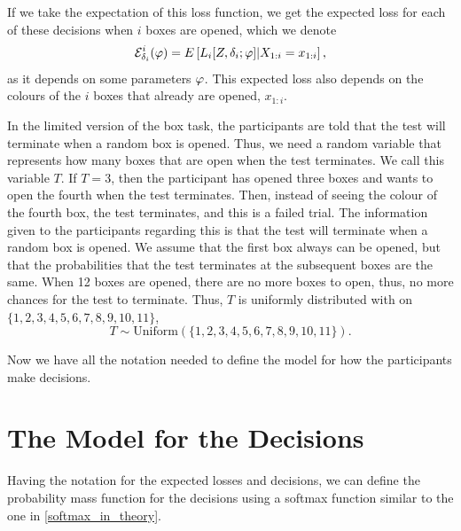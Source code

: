 If we take the expectation of this loss function, we get the expected loss for each of these decisions when $i$ boxes are opened, which we denote
\begin{equation*}
    \mathcal{E}^i_{\delta_i}(\varphi) = E\left[ L_i[Z,\delta_i;\varphi]|X_{1:i}=x_{1:i}\right],
\end{equation*}
as it depends on some parameters $\varphi$. This expected loss also depends on the colours of the $i$ boxes that already are opened, $x_{1:i}$.

In the limited version of the box task, the participants are told that the test will terminate when a random box is opened. Thus, we need a random variable that represents how many boxes that are open when the test terminates. We call this variable $T$. If $T=3$, then the participant has opened three boxes and wants to open the fourth when the test terminates. Then, instead of seeing the colour of the fourth box, the test terminates, and this is a failed trial. The information given to the participants regarding this is that the test will terminate when a random box is opened. We assume that the first box always can be opened, but that the probabilities that the test terminates at the subsequent boxes are the same. When 12 boxes are opened, there are no more boxes to open, thus, no more chances for the test to terminate. Thus, $T$ is uniformly distributed with on $\{1,2,3,4,5,6,7,8,9,10,11\}$, 
\begin{equation}
\label{T_uniform}
    T \sim \text{Uniform}(\{1,2,3,4,5,6,7,8,9,10,11\}).
\end{equation}

Now we have all the notation needed to define the model for how the participants make decisions. 

\section{The Model for the Decisions}
Having the notation for the expected losses and decisions, we can define the probability mass function for the decisions using a softmax function similar to the one in \eqref{softmax_in_theory}. 

